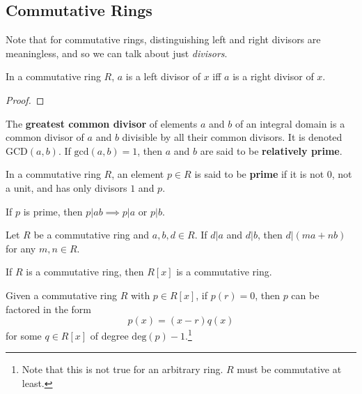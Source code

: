 \subsection{Commutative Rings} 

  Note that for commutative rings, distinguishing left and right divisors are meaningless, and so we can talk about just \textit{divisors}. 

  \begin{lemma}[Left=Right Divisors]
    In a commutative ring $R$, $a$ is a left divisor of $x$ iff $a$ is a right divisor of $x$. 
  \end{lemma}
  \begin{proof}
    
  \end{proof} 

  \begin{definition}
    The \textbf{greatest common divisor} of elements $a$ and $b$ of an integral domain is a common divisor of $a$ and $b$ divisible by all their common divisors. It is denoted GCD$(a, b)$. If $\mathrm{gcd}(a, b) = 1$, then $a$ and $b$ are said to be \textbf{relatively prime}. 
  \end{definition} 

  \begin{definition}
    In a commutative ring $R$, an element $p \in R$ is said to be \textbf{prime} if it is not $0$, not a unit, and has only divisors $1$ and $p$. 
  \end{definition}

  \begin{lemma}[Euclid]
    If $p$ is prime, then $p|ab \implies p|a$ or $p|b$.  
  \end{lemma}

  \begin{lemma} 
    Let $R$ be a commutative ring and $a, b, d \in R$. If $d|a$ and $d|b$, then $d | (ma + nb)$ for any $m, n \in R$. 
  \end{lemma} 

  \begin{theorem}
    If $R$ is a commutative ring, then $R[x]$ is a commutative ring. 
  \end{theorem}

  \begin{theorem}
    Given a commutative ring $R$ with $p \in R[x]$, if $p(r) = 0$, then $p$ can be factored in the form 
    \begin{equation}
      p(x) = (x - r) q(x)
    \end{equation}
    for some $q \in R[x]$ of degree $\mathrm{deg}(p) - 1$.\footnote{Note that this is not true for an arbitrary ring. $R$ must be commutative at least. }
  \end{theorem}

